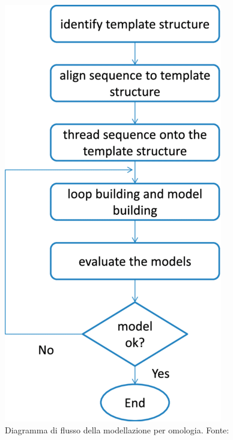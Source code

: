 {\begin{figure}[!htb]
	\includegraphics[scale=0.43]{images/homology1.png}
	\caption{Diagramma di flusso della modellazione per omologia. Fonte: \cite{sliwoski2014computational}}
	\label{fig:omologia-flusso}
	\endminipage\hfill
	\centering

\end{figure}}
